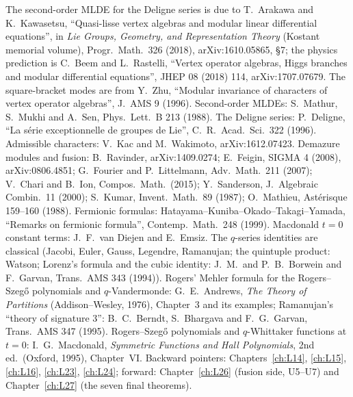 The second-order MLDE for the Deligne series is due to T.~Arakawa and K.~Kawasetsu, ``Quasi-lisse vertex algebras and
modular linear differential equations'', in \emph{Lie Groups, Geometry, and Representation Theory} (Kostant memorial
volume), Progr.\ Math.\ 326 (2018), arXiv:1610.05865, \S7; the physics prediction is C.~Beem and L.~Rastelli, ``Vertex
operator algebras, Higgs branches and modular differential equations'', JHEP 08 (2018) 114, arXiv:1707.07679. The
square-bracket modes are from Y.~Zhu, ``Modular invariance of characters of vertex operator algebras'', J.\ AMS 9
(1996). Second-order MLDEs: S.~Mathur, S.~Mukhi and A.~Sen, Phys.\ Lett.\ B 213 (1988). The Deligne series:
P.~Deligne, ``La s\'erie exceptionnelle de groupes de Lie'', C.\ R.\ Acad.\ Sci.\ 322 (1996). Admissible characters:
V.~Kac and M.~Wakimoto, arXiv:1612.07423. Demazure modules and fusion: B.~Ravinder, arXiv:1409.0274; E.~Feigin,
SIGMA 4 (2008), arXiv:0806.4851; G.~Fourier and P.~Littelmann, Adv.\ Math.\ 211 (2007); V.~Chari and B.~Ion,
Compos.\ Math.\ (2015); Y.~Sanderson, J.\ Algebraic Combin.\ 11 (2000); S.~Kumar, Invent.\ Math.\ 89 (1987);
O.~Mathieu, Ast\'erisque 159--160 (1988). Fermionic formulas: Hatayama--Kuniba--Okado--Takagi--Yamada, ``Remarks on
fermionic formula'', Contemp.\ Math.\ 248 (1999). Macdonald $t=0$ constant terms: J.~F.~van Diejen and E.~Emsiz.
The $q$-series identities are classical (Jacobi, Euler, Gauss, Legendre, Ramanujan; the quintuple product: Watson;
Lorenz's formula and the cubic identity: J.~M.~and P.~B.~Borwein and F.~Garvan, Trans.\ AMS 343 (1994)). Rogers'
Mehler formula for the Rogers--Szeg\H{o} polynomials and $q$-Vandermonde: G.~E.~Andrews, \emph{The Theory of Partitions}
(Addison--Wesley, 1976), Chapter~3 and its examples; Ramanujan's ``theory of signature 3'': B.~C.~Berndt,
S.~Bhargava and F.~G.~Garvan, Trans.\ AMS 347 (1995). Rogers--Szeg\H{o} polynomials and $q$-Whittaker functions at $t=0$:
I.~G.~Macdonald, \emph{Symmetric Functions and Hall Polynomials}, 2nd ed.\ (Oxford, 1995), Chapter~VI. Backward
pointers: Chapters~\ref{ch:L14}, \ref{ch:L15}, \ref{ch:L16}, \ref{ch:L23}, \ref{ch:L24}; forward: Chapter~\ref{ch:L26}
(fusion side, U5--U7) and Chapter~\ref{ch:L27} (the seven final theorems).

\endgroup
